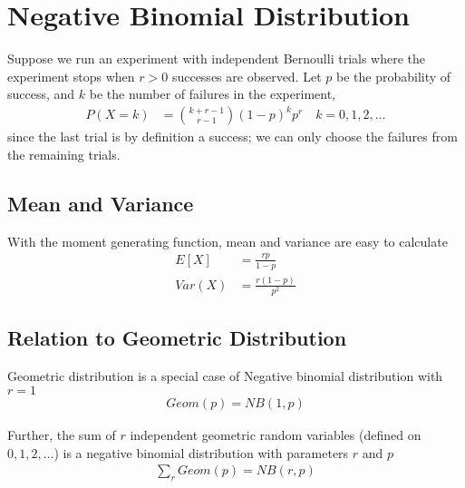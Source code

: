 \documentclass[../../probability-notes.tex]{subfiles}
\begin{document}
    \section{Negative Binomial Distribution}
    Suppose we run an experiment with independent Bernoulli trials where the experiment stops when $r > 0$ successes are observed. Let $p$ be the probability of success, and $k$ be the number of failures in the experiment,
    \begin{align*}
        P(X = k) &= \binom{k + r - 1}{r-1}(1-p)^{k}p^{r} \quad k = 0, 1, 2, \ldots
    \end{align*}
    since the last trial is by definition a success; we can only choose the failures from the remaining trials.

    \subsection{Mean and Variance}
    With the moment generating function, mean and variance are easy to calculate
    \begin{align*}
        E[X] &= \frac{rp}{1-p}\\
        Var(X) &= \frac{r(1-p)}{p^{2}}
    \end{align*}

    \subsection{Relation to Geometric Distribution}
    Geometric distribution is a special case of Negative binomial distribution with $r = 1$
    \begin{align*}
        Geom(p) = NB(1, p)
    \end{align*}

    Further, the sum of $r$ independent geometric random variables (defined on $0,1,2,\ldots$) is a negative binomial distribution with parameters $r$ and $p$
    \begin{align*}
        \sum_{r} Geom(p) = NB(r, p)
    \end{align*}
\end{document}
